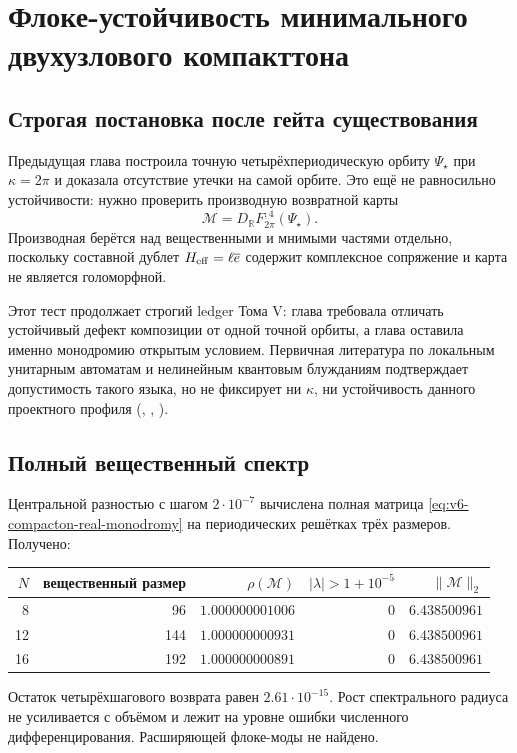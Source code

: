 \chapter{Флоке-устойчивость минимального двухузлового компакттона}
\label{ch:v6-spectral-transition-discrete-compacton-stability-quantization-gate}

\section{Строгая постановка после гейта существования}

Предыдущая глава построила точную четырёхпериодическую орбиту
$\Psi_\star$ при $\kappa=2\pi$ и доказала отсутствие утечки на самой
орбите. Это ещё не равносильно устойчивости: нужно проверить производную
возвратной карты
\begin{equation}
 \mathcal M=D_{\mathbb R}F_{2\pi}^{,4}(\Psi_\star).
 \label{eq:v6-compacton-real-monodromy}
\end{equation}
Производная берётся над вещественными и мнимыми частями отдельно, поскольку
составной дублет $H_{\rm eff}=\ell\overline e$ содержит комплексное
сопряжение и карта не является голоморфной.

Этот тест продолжает строгий ledger Тома V: глава
 требовала
отличать устойчивый дефект композиции от одной точной орбиты, а глава
оставила именно монодромию открытым условием. Первичная литература по
локальным унитарным автоматам и нелинейным квантовым блужданиям
подтверждает допустимость такого языка, но не фиксирует ни $\kappa$, ни
устойчивость данного проектного профиля
(, ,
).

\section{Полный вещественный спектр}

Центральной разностью с шагом $2\cdot10^{-7}$ вычислена полная матрица
\eqref{eq:v6-compacton-real-monodromy} на периодических решётках трёх
размеров. Получено:
\begin{center}
\begin{tabular}{@{}rrrrr@{}}
\toprule
$N$ & вещественный размер & $\rho(\mathcal M)$ & $|\lambda|>1+10^{-5}$ & $\|\mathcal M\|_2$ \\
\midrule
8  & 96  & $1.000000001006$ & 0 & $6.438500961$ \\
12 & 144 & $1.000000000931$ & 0 & $6.438500961$ \\
16 & 192 & $1.000000000891$ & 0 & $6.438500961$ \\
\bottomrule
\end{tabular}
\end{center}
Остаток четырёхшагового возврата равен $2.61\cdot10^{-15}$. Рост
спектрального радиуса не усиливается с объёмом и лежит на уровне ошибки
численного дифференцирования. Расширяющей флоке-моды не найдено.

